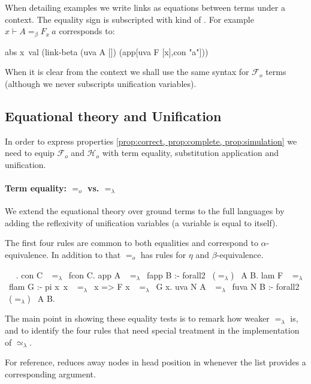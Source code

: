 \documentclass[sigconf,natbib=false,review]{acmart}
\newcommand{\EqualRel}{\ensuremath{=}}
\newcommand{\UnifRel}{\ensuremath{\simeq}}
\newcommand{\Eo}{\ensuremath{\EqualRel_o}\xspace}
\newcommand{\Ue}{\ensuremath{\UnifRel_\lambda}\xspace}
\newcommand{\Ee}{\ensuremath{\EqualRel_\lambda}\xspace}
\newcommand{\Fo}{\ensuremath{\mathcal{F}_{\!o}\xspace}} %
\newcommand{\Ho}{\ensuremath{\mathcal{H}_o}\xspace}
\newcommand{\linkbetaM}[3]{\ensuremath{#1 \vdash #2 =_\beta #3}}
\begin{document}
\noindent
When detailing examples we write links as equations between terms under a context.
The equality sign is subscripted with
kind of . For example $\linkbetaM{x}{A}{F_x~a}$ corresponds to:
\begin{elpicode}
abs x\ val (link-beta (uva A []) (app[uva F [x],con "a"]))
\end{elpicode}

\noindent
When it is clear from the context we shall use the same syntax for \Fo{} terms
(although we never subscripts unification variables).

\subsection{Equational theory and Unification}

In order to express properties \ref{prop:correct, prop:complete, prop:simulation}
we need to equip \Fo{} and \Ho with term equality,
substitution application and unification.

\paragraph{Term equality: \Eo vs. \Ee} We extend the equational theory
over ground terms to the full languages by adding the reflexivity of
unification variables (a variable is equal to itself).

The first four rules are common to both equalities and correspond to $\alpha$-equivalence.
In addition to that \Eo has rules for $\eta$ and $\beta$-equivalence.



\begin{elpicode}
  ~ \PYG{n+nf}{(\Ee)} ~.
  con C ~\Ee~fcon C.
  app A ~\Ee~fapp B :- forall2 ~(\Ee)~ A B.
  lam F ~\Ee~flam G :- pi x\ x ~\Ee~x => F x ~\Ee~G x.
  uva N A ~\Ee~fuva N B :- forall2 ~(\Ee)~ A B.
\end{elpicode}

\noindent
The main point in showing these equality tests is to remark how weaker \Ee is,
and to identify the four rules that need special treatment in
the implementation of \Ue.

For reference,  reduces away  nodes in head
position in  whenever the list  provides a corresponding
argument.


\end{document}

